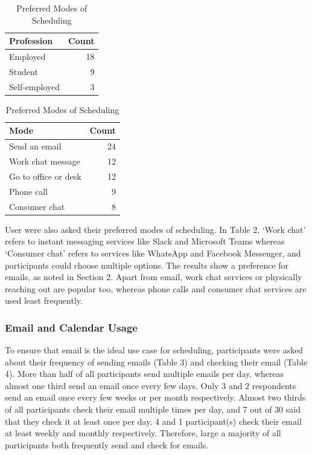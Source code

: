 \documentclass{article}
\begin{document}
\begin{table}[!htb]
	\begin{minipage}{.5\linewidth}
		\caption{Professions of Participants}
		\centering
		\begin{tabular}{lr}
			\hline
			\textbf{Profession} & \textbf{Count} \\
			\hline
			Employed            & 18             \\
			Student             & 9              \\
			Self-employed       & 3              \\
			\hline
		\end{tabular}
	\end{minipage}%
	\hspace{.1cm}
	\begin{minipage}{.5\linewidth}
		\centering
		\caption{Preferred Modes of Scheduling}
		\begin{tabular}{lr}
			\hline
			\textbf{Mode}        & \textbf{Count} \\
			\hline
			Send an email        & 24             \\
			Work chat message    & 12             \\
			Go to office or desk & 12             \\
			Phone call           & 9              \\
			Consumer chat        & 8              \\
			\hline
		\end{tabular}
	\end{minipage}
\end{table}

User were also asked their preferred modes of scheduling. In Table 2, `Work chat' refers to instant messaging services like Slack and Microsoft Teams whereas `Consumer chat' refers to services like WhatsApp and Facebook Messenger, and participants could choose multiple options. The results show a preference for emails, as noted in Section 2. Apart from email, work chat services or physically reaching out are popular too, whereas phone calls and consumer chat services are used least frequently.

\subsubsection{Email and Calendar Usage}

To ensure that email is the ideal use case for scheduling, participants were asked about their frequency of sending emails (Table 3) and checking their email (Table 4). More than half of all participants send multiple emails per day, whereas almost one third send an email once every few days. Only 3 and 2 respondents send an email once every few weeks or per month respectively. Almost two thirds of all participants check their email multiple times per day, and 7 out of 30 said that they check it at least once per day. 4 and 1 participant(s) check their email at least weekly and monthly respectively. Therefore, large a majority of all participants both frequently send and check for emails.
\end{document}
